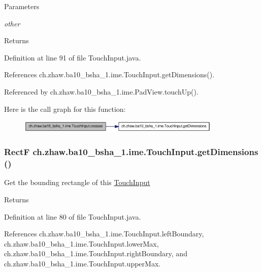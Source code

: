 \begin{DoxyParams}{Parameters}
\item[{\em other}]\end{DoxyParams}
\begin{DoxyReturn}{Returns}

\end{DoxyReturn}


Definition at line 91 of file TouchInput.java.

References ch.zhaw.ba10\_\-bsha\_\-1.ime.TouchInput.getDimensions().

Referenced by ch.zhaw.ba10\_\-bsha\_\-1.ime.PadView.touchUp().

Here is the call graph for this function:\nopagebreak
\begin{figure}[H]
\begin{center}
\leavevmode
\includegraphics[width=275pt]{classch_1_1zhaw_1_1ba10__bsha__1_1_1ime_1_1TouchInput_adb0a9fe73a2091ae7c3bdebe40be8a25_cgraph}
\end{center}
\end{figure}
\hypertarget{classch_1_1zhaw_1_1ba10__bsha__1_1_1ime_1_1TouchInput_ac68086768e724f1c1847b31dca3cc851}{
\subsubsection[{getDimensions}]{\setlength{\rightskip}{0pt plus 5cm}RectF ch.zhaw.ba10\_\-bsha\_\-1.ime.TouchInput.getDimensions ()}}
\label{classch_1_1zhaw_1_1ba10__bsha__1_1_1ime_1_1TouchInput_ac68086768e724f1c1847b31dca3cc851}
Get the bounding rectangle of this \hyperlink{classch_1_1zhaw_1_1ba10__bsha__1_1_1ime_1_1TouchInput}{TouchInput}

\begin{DoxyReturn}{Returns}

\end{DoxyReturn}


Definition at line 80 of file TouchInput.java.

References ch.zhaw.ba10\_\-bsha\_\-1.ime.TouchInput.leftBoundary, ch.zhaw.ba10\_\-bsha\_\-1.ime.TouchInput.lowerMax, ch.zhaw.ba10\_\-bsha\_\-1.ime.TouchInput.rightBoundary, and ch.zhaw.ba10\_\-bsha\_\-1.ime.TouchInput.upperMax.

